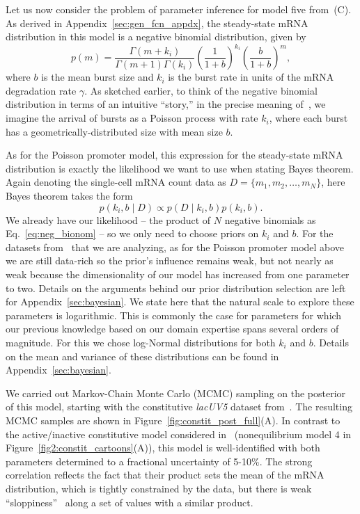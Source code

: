 Let us now consider the problem of parameter inference for model five
from~(C). As derived in
Appendix~\ref{sec:gen_fcn_appdx}, the steady-state mRNA distribution in this
model is a negative binomial distribution, given by
\begin{equation}
p(m) = \frac{\Gamma(m+k_i)}{\Gamma(m+1)\Gamma(k_i)}
        \left(\frac{1}{1+b}\right)^{k_i}
        \left(\frac{b}{1+b}\right)^m,
\label{eq:neg_bionom}
\end{equation}
where $b$ is the mean burst size and $k_i$ is the burst rate in units of the
mRNA degradation rate $\gamma$. As sketched earlier, to think of the negative
binomial distribution in terms of an intuitive ``story,'' in the precise
meaning of~\cite{Blitzstein2015}, we imagine the arrival of
bursts as a Poisson process with rate $k_i$, where each burst has a
geometrically-distributed size with mean size $b$.

As for the Poisson promoter model, this expression for the steady-state mRNA
distribution is exactly the likelihood we want to use when stating Bayes
theorem. Again denoting the single-cell mRNA count data as $D=\{m_1, m_2,\dots,
m_N\}$, here Bayes theorem takes the form
\begin{equation}
p(k_i, b \mid D) \propto p(D\mid k_i,b)p(k_i, b).
\end{equation}
We already have our likelihood -- the product of $N$ negative binomials as
Eq.~\ref{eq:neg_bionom} -- so we only need to choose priors on $k_i$ and $b$.
For the datasets from~\cite{Jones2014} that we are analyzing, as for the Poisson
promoter model above we are still data-rich so the prior's influence remains
weak, but not nearly as weak because the dimensionality of our model has
increased from one parameter to two. Details on the arguments behind our prior
distribution selection are left for Appendix~\ref{sec:bayesian}. We state here
that the natural scale to explore these parameters is logarithmic. This is
commonly the case for parameters for which our previous knowledge based on our
domain expertise spans several orders of magnitude. For this we chose log-Normal
distributions for both $k_i$ and $b$. Details on the mean and variance of these
distributions can be found in Appendix~\ref{sec:bayesian}.

We carried out Markov-Chain Monte Carlo (MCMC) sampling on the posterior of this
model, starting with the constitutive \textit{lacUV5} dataset
from~\cite{Jones2014}. The resulting MCMC samples are shown in
Figure~\ref{fig:constit_post_full}(A). In contrast to the active/inactive
constitutive model considered in~\cite{Razo-Mejia2020} (nonequilibrium model 4
in Figure~\ref{fig2:constit_cartoons}(A)), this model is well-identified with both
parameters determined to a fractional uncertainty of 5-10\%. The strong
correlation reflects the fact that their product sets the mean of the mRNA
distribution, which is tightly constrained by the data, but there is weak
``sloppiness''~\cite{Transtrum2015} along a set of values with a similar
product.

